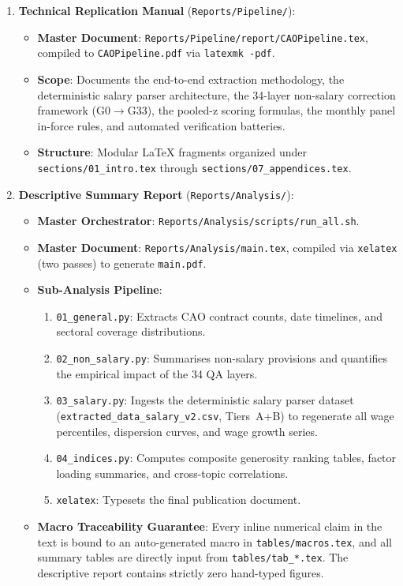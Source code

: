 \begin{enumerate}[leftmargin=1.8em]
  \item \textbf{Technical Replication Manual} (\nolinkurl{Reports/Pipeline/}):
    \begin{itemize}[leftmargin=1.2em]
      \item \textbf{Master Document}: \nolinkurl{Reports/Pipeline/report/CAOPipeline.tex}, compiled to \nolinkurl{CAOPipeline.pdf} via \texttt{latexmk -pdf}.
      \item \textbf{Scope}: Documents the end-to-end extraction methodology, the deterministic salary parser architecture, the 34-layer non-salary correction framework (G0$\rightarrow$G33), the pooled-z scoring formulas, the monthly panel in-force rules, and automated verification batteries.
      \item \textbf{Structure}: Modular LaTeX fragments organized under \nolinkurl{sections/01_intro.tex} through \nolinkurl{sections/07_appendices.tex}.
    \end{itemize}

  \item \textbf{Descriptive Summary Report} (\nolinkurl{Reports/Analysis/}):
    \begin{itemize}[leftmargin=1.2em]
      \item \textbf{Master Orchestrator}: \nolinkurl{Reports/Analysis/scripts/run_all.sh}.
      \item \textbf{Master Document}: \nolinkurl{Reports/Analysis/main.tex}, compiled via \texttt{xelatex} (two passes) to generate \nolinkurl{main.pdf}.
      \item \textbf{Sub-Analysis Pipeline}:
        \begin{enumerate}[leftmargin=1.0em]
          \item \nolinkurl{01_general.py}: Extracts CAO contract counts, date timelines, and sectoral coverage distributions.
          \item \nolinkurl{02_non_salary.py}: Summarises non-salary provisions and quantifies the empirical impact of the 34 QA layers.
          \item \nolinkurl{03_salary.py}: Ingests the deterministic salary parser dataset (\nolinkurl{extracted_data_salary_v2.csv}, Tiers~A+B) to regenerate all wage percentiles, dispersion curves, and wage growth series.
          \item \nolinkurl{04_indices.py}: Computes composite generosity ranking tables, factor loading summaries, and cross-topic correlations.
          \item \texttt{xelatex}: Typesets the final publication document.
        \end{enumerate}
      \item \textbf{Macro Traceability Guarantee}: Every inline numerical claim in the text is bound to an auto-generated macro in \nolinkurl{tables/macros.tex}, and all summary tables are directly input from \nolinkurl{tables/tab_*.tex}. The descriptive report contains strictly zero hand-typed figures.
    \end{itemize}
\end{enumerate}

